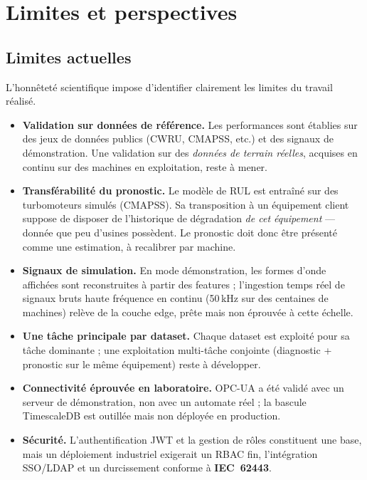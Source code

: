 \chapter{Limites et perspectives}
\label{chap:limites}

\section{Limites actuelles}
L'honnêteté scientifique impose d'identifier clairement les limites du travail réalisé.
\begin{itemize}[leftmargin=1.5em]
  \item \textbf{Validation sur données de référence.} Les performances sont établies sur des
        jeux de données publics (CWRU, CMAPSS, etc.) et des signaux de démonstration. Une
        validation sur des \emph{données de terrain réelles}, acquises en continu sur des
        machines en exploitation, reste à mener.
  \item \textbf{Transférabilité du pronostic.} Le modèle de RUL est entraîné sur des
        turbomoteurs simulés (CMAPSS). Sa transposition à un équipement client suppose de
        disposer de l'historique de dégradation \emph{de cet équipement} --- donnée que peu
        d'usines possèdent. Le pronostic doit donc être présenté comme une estimation, à
        recalibrer par machine.
  \item \textbf{Signaux de simulation.} En mode démonstration, les formes d'onde affichées
        sont reconstruites à partir des features ; l'ingestion temps réel de signaux bruts
        haute fréquence en continu (50\,kHz sur des centaines de machines) relève de la
        couche edge, prête mais non éprouvée à cette échelle.
  \item \textbf{Une tâche principale par dataset.} Chaque dataset est exploité pour sa tâche
        dominante ; une exploitation multi-tâche conjointe (diagnostic + pronostic sur le
        même équipement) reste à développer.
  \item \textbf{Connectivité éprouvée en laboratoire.} OPC-UA a été validé avec un serveur de
        démonstration, non avec un automate réel ; la bascule TimescaleDB est outillée mais
        non déployée en production.
  \item \textbf{Sécurité.} L'authentification JWT et la gestion de rôles constituent une
        base, mais un déploiement industriel exigerait un RBAC fin, l'intégration SSO/LDAP et
        un durcissement conforme à \textbf{IEC~62443}.
\end{itemize}

